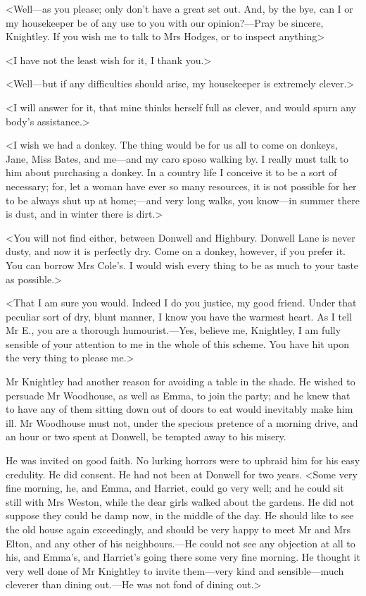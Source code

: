 <Well—as you please; only don't have a great set out. And, by the bye, can I or my housekeeper be of any use to you with our opinion?—Pray be sincere, Knightley. If you wish me to talk to Mrs Hodges, or to inspect anything\longdash>

<I have not the least wish for it, I thank you.>

<Well—but if any difficulties should arise, my housekeeper is extremely clever.>

<I will answer for it, that mine thinks herself full as clever, and would spurn any body's assistance.>

<I wish we had a donkey. The thing would be for us all to come on donkeys, Jane, Miss Bates, and me—and my caro sposo walking by. I really must talk to him about purchasing a donkey. In a country life I conceive it to be a sort of necessary; for, let a woman have ever so many resources, it is not possible for her to be always shut up at home;—and very long walks, you know—in summer there is dust, and in winter there is dirt.>

<You will not find either, between Donwell and Highbury. Donwell Lane is never dusty, and now it is perfectly dry. Come on a donkey, however, if you prefer it. You can borrow Mrs Cole's. I would wish every thing to be as much to your taste as possible.>

<That I am sure you would. Indeed I do you justice, my good friend. Under that peculiar sort of dry, blunt manner, I know you have the warmest heart. As I tell Mr E., you are a thorough humourist.—Yes, believe me, Knightley, I am fully sensible of your attention to me in the whole of this scheme. You have hit upon the very thing to please me.>

Mr Knightley had another reason for avoiding a table in the shade. He wished to persuade Mr Woodhouse, as well as Emma, to join the party; and he knew that to have any of them sitting down out of doors to eat would inevitably make him ill. Mr Woodhouse must not, under the specious pretence of a morning drive, and an hour or two spent at Donwell, be tempted away to his misery.

He was invited on good faith. No lurking horrors were to upbraid him for his easy credulity. He did consent. He had not been at Donwell for two years. <Some very fine morning, he, and Emma, and Harriet, could go very well; and he could sit still with Mrs Weston, while the dear girls walked about the gardens. He did not suppose they could be damp now, in the middle of the day. He should like to see the old house again exceedingly, and should be very happy to meet Mr and Mrs Elton, and any other of his neighbours.—He could not see any objection at all to his, and Emma's, and Harriet's going there some very fine morning. He thought it very well done of Mr Knightley to invite them—very kind and sensible—much cleverer than dining out.—He was not fond of dining out.>

